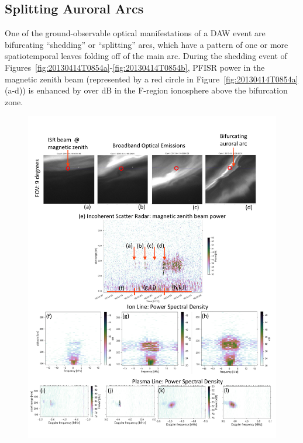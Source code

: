 \subsection{Splitting Auroral Arcs}\label{sec:split}
One of the ground-observable optical manifestations of a DAW event are bifurcating ``shedding'' or ``splitting'' arcs, which have a pattern of one or more spatiotemporal leaves folding off of the main arc. 
During the shedding event of Figures~\ref{fig:20130414T0854a}-\ref{fig:20130414T0854b}, PFISR power in the magnetic zenith beam (represented by a red circle in Figure~\ref{fig:20130414T0854a}(a-d)) is enhanced by over \unit[25]{dB} in the F-region ionosphere above the bifurcation zone.
\begin{figure}\noindent

    \includegraphics[width=\columnwidth,trim=0 680 0 50,clip]{gfx/2013-04-14T0854/2013-04-14T0854}\\
    
    \vspace{-1.175cm}
    \vspace{0.5cm}
    

\end{figure}
